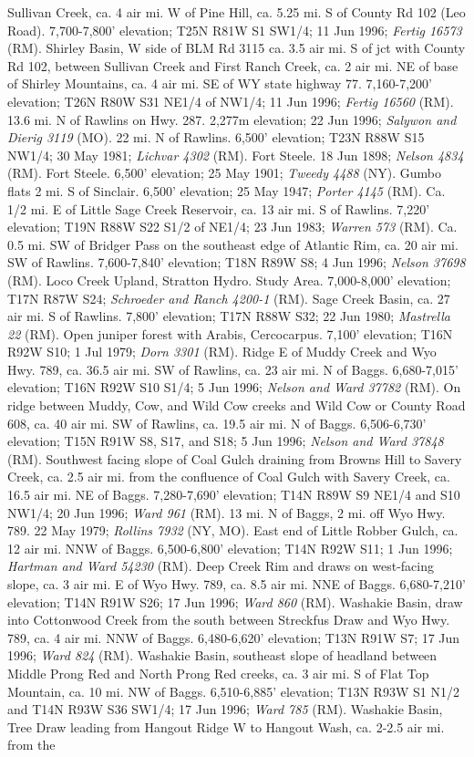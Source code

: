 Sullivan Creek, ca. 4 air mi. W of Pine Hill, ca. 5.25 mi. S of County Rd 102 (Leo Road). 7,700-7,800’ elevation; T25N R81W S1 SW1/4; 11 Jun 1996; \textit{Fertig 16573} (RM).  Shirley Basin, W side of BLM Rd 3115 ca. 3.5 air mi. S of jct with County Rd 102, between Sullivan Creek and First Ranch Creek, ca. 2 air mi. NE of base of Shirley Mountains, ca. 4 air mi. SE of WY state highway 77. 7,160-7,200’ elevation; T26N R80W S31 NE1/4 of NW1/4; 11 Jun 1996; \textit{Fertig 16560} (RM).  13.6 mi. N of Rawlins on Hwy. 287. 2,277m elevation; 22 Jun 1996; \textit{Salywon and Dierig 3119} (MO).  22 mi. N of Rawlins. 6,500’ elevation; T23N R88W S15 NW1/4; 30 May 1981; \textit{Lichvar 4302} (RM).  Fort Steele. 18 Jun 1898; \textit{Nelson 4834} (RM).  Fort Steele. 6,500’ elevation; 25 May 1901; \textit{Tweedy 4488} (NY).  Gumbo flats 2 mi. S of Sinclair. 6,500’ elevation; 25 May 1947; \textit{Porter 4145} (RM).  Ca. 1/2 mi. E of Little Sage Creek Reservoir, ca. 13 air mi. S of Rawlins. 7,220’ elevation; T19N R88W S22 S1/2 of NE1/4; 23 Jun 1983; \textit{Warren 573} (RM).  Ca. 0.5 mi. SW of Bridger Pass on the southeast edge of Atlantic Rim, ca. 20 air mi. SW of Rawlins. 7,600-7,840’ elevation; T18N R89W S8; 4 Jun 1996; \textit{Nelson 37698} (RM).  Loco Creek Upland, Stratton Hydro. Study Area. 7,000-8,000’ elevation; T17N R87W S24; \textit{Schroeder and Ranch 4200-1} (RM).  Sage Creek Basin, ca. 27 air mi. S of Rawlins. 7,800’ elevation; T17N R88W S32; 22 Jun 1980; \textit{Mastrella 22} (RM).  Open juniper forest with Arabis, Cercocarpus. 7,100’ elevation; T16N R92W S10; 1 Jul 1979; \textit{Dorn 3301} (RM).  Ridge E of Muddy Creek and Wyo Hwy. 789, ca. 36.5 air mi. SW of Rawlins, ca. 23 air mi. N of Baggs. 6,680-7,015’ elevation; T16N R92W S10 S1/4; 5 Jun 1996; \textit{Nelson and Ward 37782} (RM).  On ridge between Muddy, Cow, and Wild Cow creeks and Wild Cow or County Road 608, ca. 40 air mi. SW of Rawlins, ca. 19.5 air mi. N of Baggs. 6,506-6,730’ elevation; T15N R91W S8, S17, and S18; 5 Jun 1996; \textit{Nelson and Ward 37848} (RM).  Southwest facing slope of Coal Gulch draining from Browns Hill to Savery Creek, ca. 2.5 air mi. from the confluence of Coal Gulch with Savery Creek, ca. 16.5 air mi. NE of Baggs.	7,280-7,690' elevation; T14N R89W S9 NE1/4 and S10 NW1/4; 20 Jun 1996; \textit{Ward 961} (RM).  13 mi. N of Baggs, 2 mi. off Wyo Hwy. 789. 22 May 1979; \textit{Rollins 7932} (NY, MO).  East end of Little Robber Gulch, ca. 12 air mi. NNW of Baggs. 6,500-6,800’ elevation; T14N R92W S11; 1 Jun 1996; \textit{Hartman and Ward 54230} (RM).  Deep Creek Rim and draws on west-facing slope, ca. 3 air mi. E of Wyo Hwy. 789, ca. 8.5 air mi. NNE of Baggs. 6,680-7,210’ elevation; T14N R91W S26; 17 Jun 1996; \textit{Ward 860} (RM).  Washakie Basin, draw into Cottonwood Creek from the south between Streckfus Draw and Wyo Hwy. 789, ca. 4 air mi. NNW of Baggs. 6,480-6,620’ elevation; T13N R91W S7; 17 Jun 1996; \textit{Ward 824} (RM).  Washakie Basin, southeast slope of headland between Middle Prong Red and North Prong Red creeks, ca. 3 air mi. S of Flat Top Mountain, ca. 10 mi. NW of Baggs. 6,510-6,885’ elevation; T13N R93W S1 N1/2 and T14N R93W S36 SW1/4; 17 Jun 1996; \textit{Ward 785} (RM).  Washakie Basin, Tree Draw leading from Hangout Ridge W to Hangout Wash, ca. 2-2.5 air mi. from the 